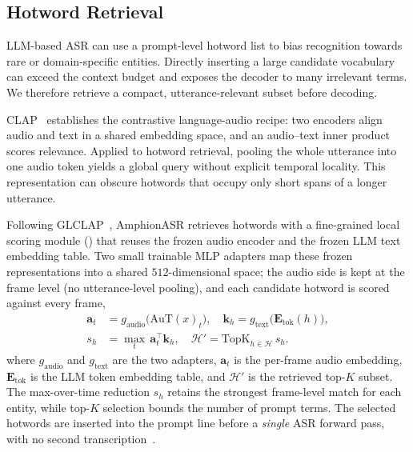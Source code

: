 \subsection{Hotword Retrieval}
\label{subsec:hotword-rag}

LLM-based ASR can use a prompt-level hotword list to bias recognition
towards rare or domain-specific entities.
Directly inserting a large candidate vocabulary can exceed the context
budget and exposes the decoder to many irrelevant terms.
We therefore retrieve a compact, utterance-relevant subset before
decoding.

CLAP~\cite{elizalde2023clap} establishes the contrastive
language-audio recipe: two encoders align audio and text in a shared
embedding space, and an audio--text inner product scores relevance.
Applied to hotword retrieval, pooling the whole utterance into one
audio token yields a global query without explicit temporal locality.
This representation can obscure hotwords that occupy only short spans
of a longer utterance.

Following GLCLAP~\cite{kong2025glclap}, AmphionASR retrieves hotwords
with a fine-grained local scoring module () that
reuses the frozen audio encoder and the frozen LLM text embedding
table. Two small trainable MLP adapters map these frozen
representations into a shared $512$-dimensional space; the audio side
is kept at the frame level (no utterance-level pooling), and each
candidate hotword is scored against every frame,
\begin{equation}
\begin{aligned}
  \mathbf{a}_t &= g_{\mathrm{audio}}\!\big(\mathrm{AuT}(x)_t\big), \quad
  \mathbf{k}_h = g_{\mathrm{text}}\!\big(\mathbf{E}_{\mathrm{tok}}(h)\big),\\
  s_h &= \max_{t}\, \mathbf{a}_t^{\top}\mathbf{k}_h, \quad
  \mathcal{H}' = \mathrm{TopK}_{h\in\mathcal{H}}\, s_h.
\end{aligned}
  \label{eq:rag-score}
\end{equation}
where $g_{\mathrm{audio}}$ and $g_{\mathrm{text}}$ are the two
adapters, $\mathbf{a}_t$ is the per-frame audio embedding,
$\mathbf{E}_{\mathrm{tok}}$ is the LLM token embedding table, and
$\mathcal{H}'$ is the retrieved top-$K$ subset. The max-over-time
reduction $s_h$ retains the strongest frame-level match for each
entity, while top-$K$ selection bounds the number of prompt terms.
The selected hotwords are inserted into the prompt line before a
\emph{single} ASR forward pass, with no second
transcription~\cite{an2025funasr}.

